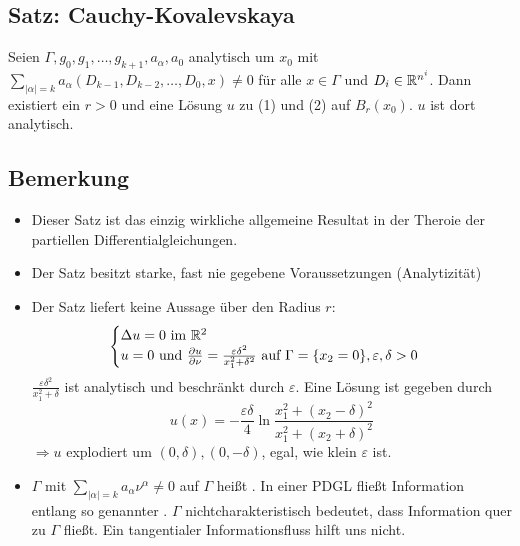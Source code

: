 \subsection{Satz: Cauchy-Kovalevskaya}
\label{sub:satz_cauchy_kova}
	Seien $\Gamma, g_0,g_1,\dots,g_{k+1},a_\alpha, a_0$ analytisch um $x_0$ mit $\sum\limits_{|\alpha| = k} a_\alpha (D_{k-1},D_{k-2}, \dots,D_0,x) \neq 0$ für alle $x \in \Gamma$ und $D_i \in \mathbb{R}^{n^i}$. Dann existiert ein $r > 0$ und eine Lösung $u$ zu (1) und (2) auf $B_r(x_0)$. $u$ ist dort analytisch. 

\subsection{Bemerkung}
	\begin{itemize}
		\item Dieser Satz ist das einzig wirkliche allgemeine Resultat in der Theroie der partiellen Differentialgleichungen. 
		\item Der Satz besitzt starke, fast nie gegebene Voraussetzungen (Analytizität)
		\item Der Satz liefert keine Aussage über den Radius $r$: %
			\[ \begin{cases}
				\Delta u = 0 \text{ im } \mathbb{R}^2 \\
				u = 0 \text{ und } \frac{\partial u}{\partial \nu} = \frac{\varepsilon \delta^2}{x_1^2 + \delta^2} \text{ auf } \Gamma = \{x_2 = 0 \}, \varepsilon,\delta > 0 \end{cases} \]
			$\frac{\varepsilon \delta^2}{x_1^2+\delta}$ ist analytisch und beschränkt durch $\varepsilon$. Eine Lösung ist gegeben durch
			\[ u(x) = -\frac{\varepsilon \delta}{4} \ln \frac{x_1^2 + (x_2 - \delta)^2}{x_1^2+(x_2 + \delta)^2}\]
			$\Rightarrow u$ explodiert um $(0,\delta),(0,-\delta)$, egal, wie klein $\varepsilon$ ist.
		\item \begin{minipage}[t]{11cm}
		$\Gamma$ mit $\sum\limits_{|\alpha| = k} a_\alpha \nu^\alpha \neq 0$ auf $\Gamma$ heißt . In einer PDGL fließt Information entlang so genannter . $\Gamma$ nichtcharakteristisch bedeutet, dass Information quer zu $\Gamma$ fließt. Ein tangentialer Informationsfluss hilft uns nicht. 
		\end{minipage} \hfill
		\begin{minipage}[t][2cm][b]{2.5cm}

\end{minipage}
\end{itemize}
